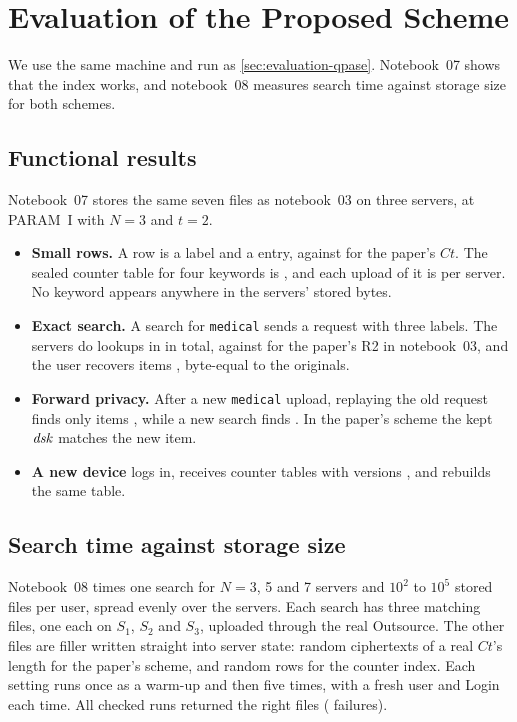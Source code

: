 \section{Evaluation of the Proposed Scheme}
\label{sec:counter-evaluation}

We use the same machine and run as \cref{sec:evaluation-qpase}. Notebook~07 shows that the index works, and
notebook~08 measures search time against storage size for both schemes.

\subsection{Functional results}

Notebook~07 stores the same seven files as notebook~03 on three servers, at PARAM~I with $N = 3$ and $t = 2$.
\begin{itemize}
  \item \textbf{Small rows.} A row is a \CiLabelBytes{} label and a \CiEntryBytes{} entry, against \SizeCt{} for the
        paper's $Ct$. The sealed counter table for four keywords is \CiSealedBytes, and each upload of it is
        \CiUploadBytes{} per server. No keyword appears anywhere in the servers' stored bytes.
  \item \textbf{Exact search.} A search for \texttt{medical} sends a \CiSearchRequestBytes{} request with three
        labels. The servers do \CiLookups{} lookups in \CiRTwoAllServers{} in total, against \RTwoAllServers{} for
        the paper's R2 in notebook~03, and the user recovers items \CiRecoveredItems, byte-equal to the originals.
  \item \textbf{Forward privacy.} After a new \texttt{medical} upload, replaying the old request finds only items
        \CiReplayItems, while a new search finds \CiNewSearchItems. In the paper's scheme the kept $\mathit{dsk}$ matches
        the new item.
  \item \textbf{A new device} logs in, receives counter tables with versions \CiNewDeviceVersions, and rebuilds the
        same table.
\end{itemize}

\subsection{Search time against storage size}

Notebook~08 times one search for $N = 3$, 5 and 7 servers and $10^2$ to $10^5$ stored files per user, spread evenly
over the servers. Each search has three matching files, one each on $S_1$, $S_2$ and $S_3$, uploaded through the
real Outsource. The other files are filler written straight into server state: random ciphertexts of a real $Ct$'s
length for the paper's scheme, and random rows for the counter index. Each setting runs once as a warm-up and then
five times, with a fresh user and Login each time. All \ScalingChecks{} checked runs returned the right files
(\ScalingFailures{} failures).

